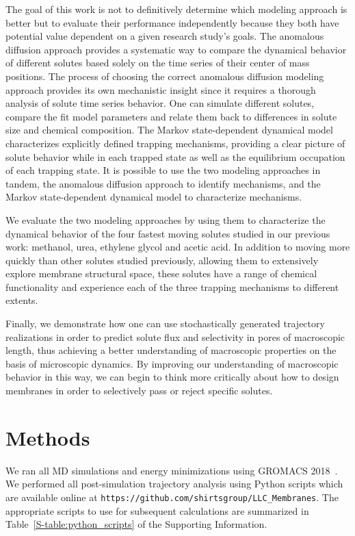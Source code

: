 \documentclass[journal=jctcce,manuscript=article]{achemso}
\begin{document}
  The goal of this work is not to definitively determine which modeling
  approach is better but to evaluate their performance independently because
  they both have potential value dependent on a given research study's goals.
  The anomalous diffusion approach provides a systematic way to compare the
  dynamical behavior of different solutes based solely on the time series of 
  their center of mass positions. The process of choosing the correct anomalous
  diffusion modeling approach provides its own mechanistic insight since it 
  requires a thorough analysis of solute time series behavior. One can simulate
  different solutes, compare the fit model parameters and relate them back to 
  differences in solute size and chemical composition. The Markov state-dependent
  dynamical model characterizes explicitly defined trapping mechanisms,
  providing a clear picture of solute behavior while in each trapped state as
  well as the equilibrium occupation of each trapping state.  It is possible to
  use the two modeling approaches in tandem, the anomalous diffusion approach to
  identify mechanisms, and the Markov state-dependent dynamical model to 
  characterize mechanisms. 
  
  We evaluate the two modeling approaches by using them to characterize the
  dynamical behavior of the four fastest moving solutes studied in our previous
  work: methanol, urea, ethylene glycol and acetic acid. In addition to moving
  more quickly than other solutes studied previously, allowing them to extensively
  explore membrane structural space, these solutes have a range of chemical 
  functionality and experience each of the three trapping mechanisms to different extents.
  
  Finally, we demonstrate how one can use stochastically generated trajectory 
  realizations in order to predict solute flux and selectivity in pores of 
  macroscopic length, thus achieving a better understanding of macroscopic 
  properties on the basis of microscopic dynamics. By improving our 
  understanding of macroscopic behavior in this way, we can begin to think more
  critically about how to design membranes in order to selectively pass or 
  reject specific solutes.
    
  \section{Methods}
    
  We ran all MD simulations and energy minimizations using GROMACS
  2018~\cite{bekker_gromacs:_1993,berendsen_gromacs:_1995,van_der_spoel_gromacs:_2005,hess_gromacs_2008}.
  We performed all post-simulation trajectory analysis using Python scripts
  which are available online at
  \texttt{https://github.com/shirtsgroup/LLC\_Membranes}. The appropriate
  scripts to use for subsequent calculations are summarized in
  Table~\ref{S-table:python_scripts} of the Supporting Information.
  
\end{document}
